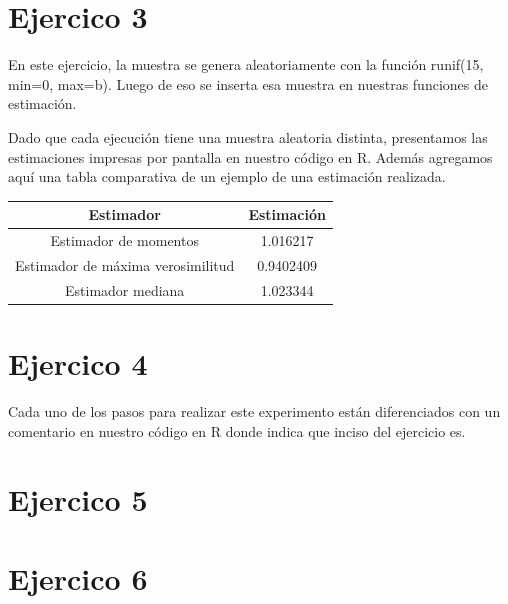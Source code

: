 \documentclass[a4paper]{article}
\begin{document}
\section{Ejercico 3}
En este ejercicio, la muestra se genera aleatoriamente con la función runif(15, min=0, max=b). Luego de eso se inserta esa muestra en nuestras funciones de estimación. 

Dado que cada ejecución tiene una muestra aleatoria distinta, presentamos las estimaciones impresas por pantalla en nuestro código en R. Además agregamos aquí una tabla comparativa de un ejemplo de una estimación realizada. 

\begin{center}
 \begin{tabular}{||c | c||} 
 \hline
 Estimador & Estimación \\ [0.5ex] 
 \hline\hline
 Estimador de momentos & 1.016217 \\ 
 \hline
 Estimador de máxima verosimilitud & 0.9402409 \\
 \hline
 Estimador mediana & 1.023344 \\ [1ex] 
 \hline
\end{tabular}
\end{center}

\section{Ejercico 4}
Cada uno de los pasos para realizar este experimento están diferenciados con un comentario en nuestro código en R donde indica que inciso del ejercicio es.


\section{Ejercico 5}

\section{Ejercico 6}
\end{document}
